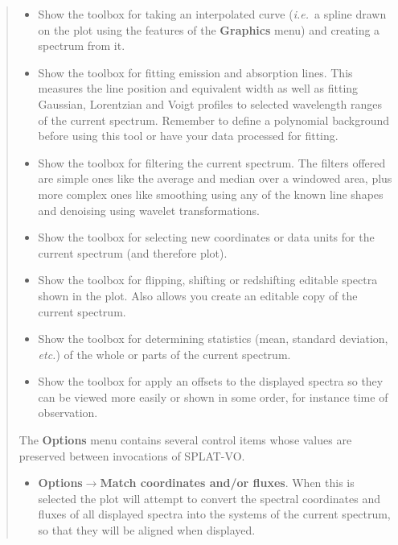 \documentclass[twoside,11pt]{article}
\newcommand{\htmladdimg}[1]{}
\newcommand{\latexhtml}[2]{#1}
\renewcommand{\_}{\texttt{\symbol{95}}}
\newcommand{\SPLAT}{\textsf{SPLAT-VO}}
\newcommand{\inline}[1]
        {\latexhtml{\texttt{[image: sun243\_figures/\#1]}}
        {\htmladdimg[align=center]{#1.gif}}}
\newcommand{\menuitem}[1]{\textbf{#1}}
\newcommand{\submenuitem}[2]{\latexhtml{\textbf{#1$\rightarrow$#2}}{\textbf{#1->#2}}}
\newcommand{\labelitem}[1]{\textbf{#1}}
\newcommand{\ie}{\textit{i.e.}}
\newcommand{\etc}{\textit{etc.}}
\begin{document}
\begin{quote}
\begin{itemize}
  \item[\inline{interpolate}] Show the toolbox for taking an interpolated
  curve (\ie\ a spline drawn on the plot using the features of the
  \labelitem{Graphics} menu) and creating a spectrum from it.

  \item[\inline{fitline}] Show the toolbox for fitting emission and absorption
  lines. This measures the line position and equivalent width as well as
  fitting Gaussian, Lorentzian and Voigt profiles to selected wavelength
  ranges of the current spectrum. Remember to define a polynomial background
  before using this tool or have your data processed for fitting.

  \item[\inline{filter}] Show the toolbox for filtering the current
  spectrum. The filters offered are simple ones like the average and
  median over a windowed area, plus more complex ones like smoothing
  using any of the known line shapes and denoising using wavelet
  transformations.

  \item[\inline{units}] Show the toolbox for selecting new coordinates or
  data units for the current spectrum (and therefore plot).

  \item[\inline{flip}] Show the toolbox for flipping, shifting or redshifting
  editable spectra shown in the plot. Also allows you create an editable copy
  of the current spectrum.

  \item[\inline{sigma}] Show the toolbox for determining statistics (mean,
  standard deviation, \etc) of the whole or parts of the current spectrum.

  \item[\inline{stacker}] Show the toolbox for apply an offsets to the
  displayed spectra so they can be viewed more easily or shown in some order,
  for instance time of observation.

 \end{itemize}

 The \menuitem{Options} menu contains several control items whose values are
 preserved between invocations of \SPLAT.

 \begin{itemize}

  \item \submenuitem{Options}{Match coordinates and/or fluxes}.
  When this is selected the plot will attempt to convert the spectral
  coordinates and fluxes of all displayed spectra into the systems of the
  current spectrum, so that they will be aligned when displayed.


\end{itemize}
\end{quote}
\end{document}
